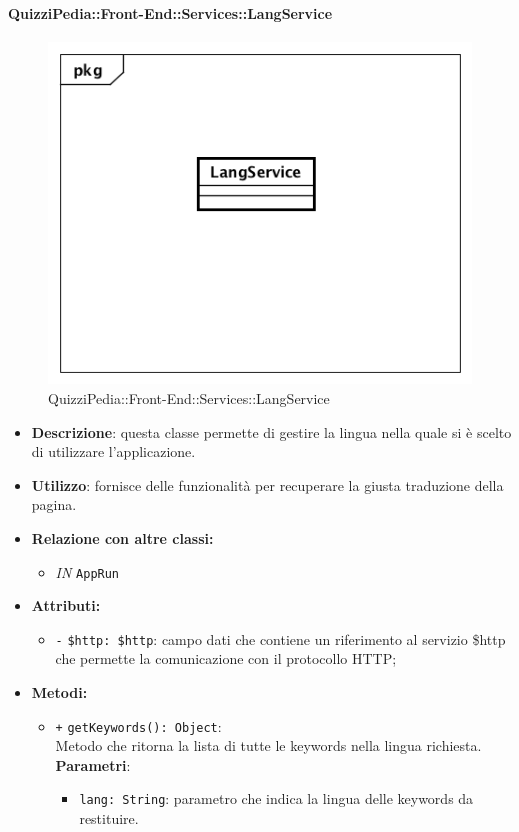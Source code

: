 \paragraph{QuizziPedia::Front-End::Services::LangService}
\begin{figure}
	\centering
	\includegraphics[scale=0.45]{UML/Classi/Front-End/QuizziPedia_Front-end_Services_ LangService.png}
	\caption{QuizziPedia::Front-End::Services::LangService}
\end{figure}
\begin{itemize}
	\item \textbf{Descrizione}: questa classe permette di gestire la lingua nella quale si è scelto di utilizzare l'applicazione.
	\item \textbf{Utilizzo}: fornisce delle funzionalità per recuperare la giusta traduzione della pagina.
	\item \textbf{Relazione con altre classi:}
	\begin{itemize}
		\item \textit{IN} \texttt{AppRun}
	\end{itemize}
	\item \textbf{Attributi:}
	\begin{itemize}
		\item \texttt{-} \texttt{\$http: \$http}: campo dati che contiene un riferimento al servizio \$http che permette la comunicazione con il protocollo HTTP;
	\end{itemize}
	\item \textbf{Metodi:}
	\begin{itemize}
		\item \texttt{+} \texttt{getKeywords(): Object}: \\Metodo che ritorna la lista di tutte le keywords nella lingua richiesta.\\
		\textbf{Parametri}:
		\begin{itemize}
			\item \texttt{lang: String}: parametro che indica la lingua delle keywords da restituire.
		\end{itemize}
	\end{itemize}
\end{itemize}

